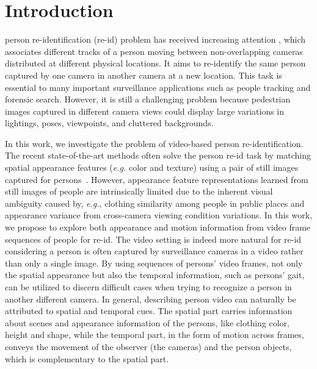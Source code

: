 \documentclass[journal]{IEEEtran}
\begin{document}
\section{Introduction}
% 
% 
% 
% 
 person re-identification (re-id) problem has received increasing attention \cite{farenzena2010person, li2014deepreid, yi2014deep, ahmed2015improved, Chen2016An, Wang2015Cross, liu2016end, liu2015kernelized, yan2016person,mclaughlinrecurrent, wang2016person, you2016top, liu2015spatio, zhu2016video, gao2016temporally}, which associates different tracks of a person moving between non-overlapping cameras distributed at different physical locations. It aims to re-identify the same person captured by one camera in another camera at a new location. This task is essential to many important surveillance applications such as people tracking and forensic search. However, it is still a  challenging problem because pedestrian images captured in different camera views could display large variations in lightings, poses, viewpoints, and cluttered backgrounds. 

\IEEEpubidadjcol

In this work, we investigate the problem of video-based person re-identification. The recent  state-of-the-art methods often solve the person re-id task  by matching  spatial appearance features (\textit{e.g.} color and texture) using a pair of still images captured for persons~\cite{farenzena2010person, li2014deepreid, yi2014deep, ahmed2015improved, liu2016end, liu2015kernelized}.  However, appearance feature representations learned from still images of people are intrinsically limited due to the inherent visual ambiguity caused by, \textit{e.g.}, clothing similarity among people in public places and appearance variance from cross-camera viewing condition variations. In this work, we propose to explore both appearance and  motion information from video frame sequences of people for re-id.  The video setting is indeed more natural for re-id considering  a person is often captured by surveillance cameras in a video rather than only  a single image. By using sequences of persons' video frames, not only the spatial appearance but also the temporal information, such as persons' gait,  can be utilized to discern difficult cases when trying to recognize a person in another different camera. In general, describing person video can naturally be attributed to spatial and temporal cues. The spatial part  carries information about scenes and appearance information of the persons, like clothing color, height and shape, while the temporal part, in the form of motion across frames, conveys the movement of the observer (the cameras) and the person objects, which is complementary to the spatial part. 
\end{document}
